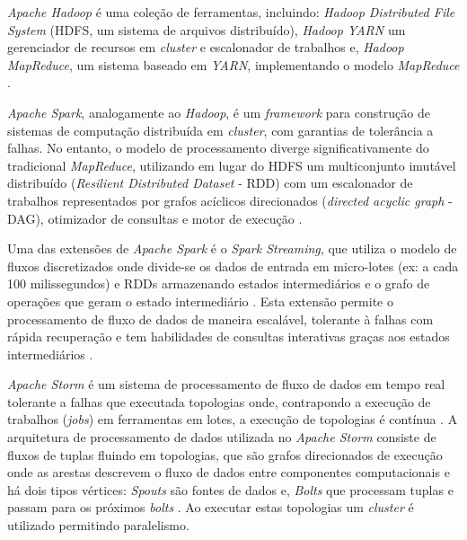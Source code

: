 \emph{Apache Hadoop} é uma coleção de ferramentas, incluindo: \emph{Hadoop
Distributed File System} (HDFS, um sistema de arquivos distribuído), \emph{Hadoop
YARN} um gerenciador de recursos em \emph{cluster} e escalonador de trabalhos e,
\emph{Hadoop MapReduce}, um sistema baseado em \emph{YARN}, implementando o modelo
\emph{MapReduce} \cite{ApacheHadoop2020}.

\emph{Apache Spark}, analogamente ao \emph{Hadoop}, é um \emph{framework} para
construção de sistemas de computação distribuída em \emph{cluster}, com garantias
de tolerância a falhas.
No entanto, o modelo de processamento diverge
significativamente do tradicional \emph{MapReduce}, utilizando em lugar do HDFS
um multiconjunto imutável distribuído (\emph{Resilient Distributed Dataset}
- RDD) com um escalonador de trabalhos representados por grafos acíclicos
direcionados (\emph{directed acyclic graph} - DAG), otimizador de consultas e
motor de execução \cite{ApacheSpark2020}.

Uma das extensões de \emph{Apache Spark} é o \emph{Spark Streaming}, que utiliza
o modelo de fluxos discretizados onde divide-se os dados de entrada em
micro-lotes (ex: a cada 100 milissegundos) e RDDs armazenando estados
intermediários e o grafo de operações que geram o estado intermediário
\cite{sparkStreaming2016}.
% 
Esta extensão permite o processamento de fluxo de dados de maneira escalável,
tolerante à falhas com rápida recuperação e tem habilidades de consultas
interativas graças aos estados intermediários
\cite{sparkStreaming2016,Lopez2018}.


% 
\emph{Apache Storm} é um sistema de processamento de fluxo de dados em tempo
real tolerante a falhas que executada topologias onde, contrapondo a execução de
trabalhos (\emph{jobs}) em ferramentas em lotes, a execução de topologias é
contínua \cite{toshniwal2014storm,Lopez2018,ApacheStorm2020}.
% 
A arquitetura de processamento de dados utilizada no \emph{Apache Storm}
consiste de fluxos de tuplas fluindo em topologias, que são grafos direcionados
de execução onde as arestas descrevem o fluxo de dados entre componentes
computacionais e há dois tipos vértices:
\emph{Spouts} são fontes de dados e,
\emph{Bolts} que processam tuplas e passam para os próximos \emph{bolts}
\cite{toshniwal2014storm}.
Ao executar estas topologias um \emph{cluster} é utilizado permitindo paralelismo.

